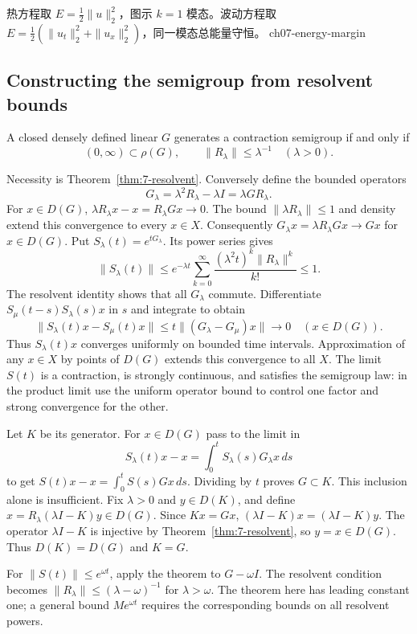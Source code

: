 {热方程取 $E=\frac12\|u\|_2^2$，图示 $k=1$ 模态。波动方程取 $E=\frac12(\|u_t\|_2^2+\|u_x\|_2^2)$，同一模态总能量守恒。}
{ch07-energy-margin}

\Needspace{55mm}
\subsection{Constructing the semigroup from resolvent bounds}
\Needspace{55mm}
\begin{theorem}
\label{thm:7-hille-yosida}
A closed densely defined linear $G$ generates a contraction semigroup if
and only if
\[
 (0,\infty)\subset\rho(G),\qquad\|R_\lambda\|\leq\lambda^{-1}
 \quad(\lambda>0).
\]
\end{theorem}
\begin{expandedproof}
Necessity is Theorem~\ref{thm:7-resolvent}. Conversely define the bounded
operators
\[
 G_\lambda=\lambda^2R_\lambda-\lambda I=\lambda GR_\lambda.
\]
For $x\in D(G)$,
$\lambda R_\lambda x-x=R_\lambda Gx\to0$.
The bound $\|\lambda R_\lambda\|\leq1$ and density extend this convergence
to every $x\in X$. Consequently $G_\lambda x=\lambda R_\lambda Gx\to Gx$
for $x\in D(G)$.
Put $S_\lambda(t)=e^{tG_\lambda}$. Its power series gives
\[
 \|S_\lambda(t)\|\leq
 e^{-\lambda t}\sum_{k=0}^\infty
       \frac{(\lambda^2t)^k\|R_\lambda\|^k}{k!}\leq1.
\]
The resolvent identity shows that all $G_\lambda$ commute. Differentiate
$S_\mu(t-s)S_\lambda(s)x$ in $s$ and integrate to obtain
\[
 \|S_\lambda(t)x-S_\mu(t)x\|
 \leq t\|(G_\lambda-G_\mu)x\|\longrightarrow0
 \quad(x\in D(G)).
\]
Thus $S_\lambda(t)x$ converges uniformly on bounded time intervals.
Approximation of any $x\in X$ by points of $D(G)$ extends this convergence
to all $X$. The limit $S(t)$ is a contraction, is strongly continuous,
and satisfies the semigroup law: in the product limit use the uniform
operator bound to control one factor and strong convergence for the other.

Let $K$ be its generator. For $x\in D(G)$ pass to the limit in
\[
 S_\lambda(t)x-x=\int_0^tS_\lambda(s)G_\lambda x\,ds
\]
to get $S(t)x-x=\int_0^tS(s)Gx\,ds$. Dividing by $t$ proves
$G\subset K$. This inclusion alone is insufficient.
Fix $\lambda>0$ and $y\in D(K)$, and define
$x=R_\lambda(\lambda I-K)y\in D(G)$. Since $Kx=Gx$,
$(\lambda I-K)x=(\lambda I-K)y$. The operator $\lambda I-K$ is
injective by Theorem~\ref{thm:7-resolvent}, so $y=x\in D(G)$.
Thus $D(K)=D(G)$ and $K=G$.
\end{expandedproof}
\Needspace{55mm}
For $\|S(t)\|\leq e^{\omega t}$, apply the theorem to $G-\omega I$.
The resolvent condition becomes
$\|R_\lambda\|\leq(\lambda-\omega)^{-1}$ for $\lambda>\omega$.
The theorem here has leading constant one; a general bound
$M e^{\omega t}$ requires the corresponding bounds on all resolvent powers.

